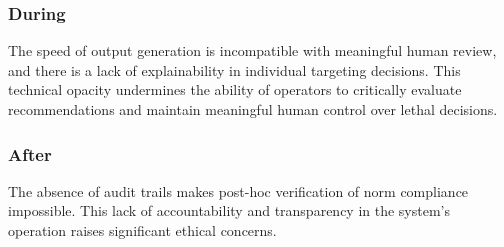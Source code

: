 
\subsubsection{During}

The speed of output generation is incompatible with meaningful human review, and there is a lack of explainability in individual targeting decisions. This technical opacity undermines the ability of operators to critically evaluate recommendations and maintain meaningful human control over lethal decisions.


\subsubsection{After}

The absence of audit trails makes post-hoc verification of norm compliance impossible. This lack of accountability and transparency in the system's operation raises significant ethical concerns.







